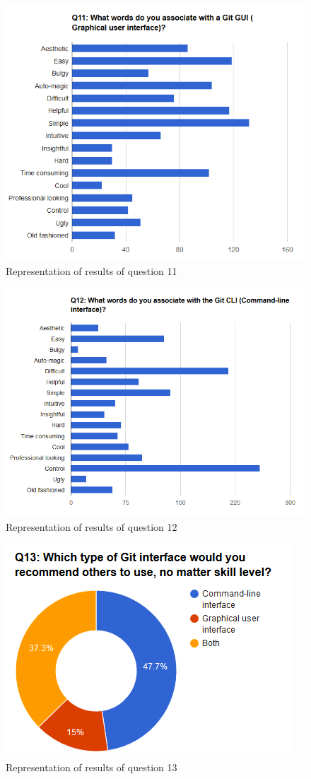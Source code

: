 \documentclass[a4paper,oneside]{bth} %
\begin{document}
		\begin{figure}[H]
			\centering
			\includegraphics[width=0.8\linewidth]{graphs/q11.png}
			\caption{Representation of results of question 11}
			\label{fig:q11}
		\end{figure}
		\begin{figure}[H]
			\centering
			\includegraphics[width=0.8\linewidth]{graphs/q12.png}
			\caption{Representation of results of question 12}
			\label{fig:q12}
		\end{figure}
		\begin{figure}[H]
			\centering
			\includegraphics[width=0.5\linewidth]{graphs/q13.png}
			\caption{Representation of results of question 13}
			\label{fig:q13}
		\end{figure}
		
\end{document}
